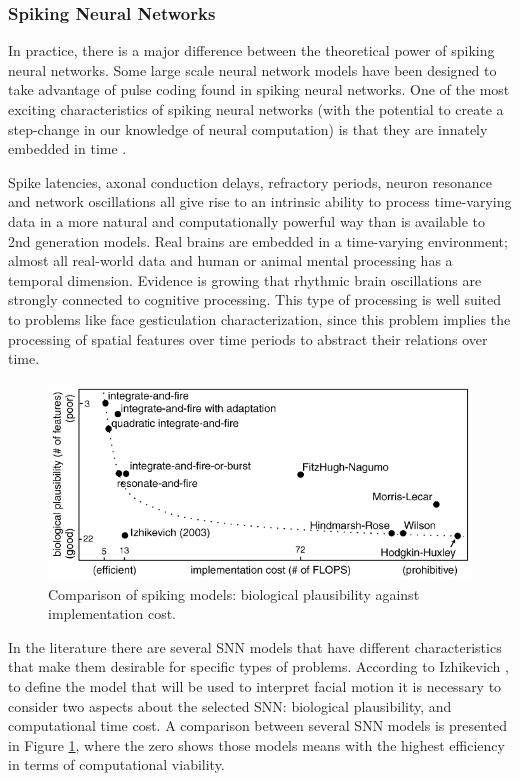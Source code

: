 \subsubsection{Spiking Neural Networks}
In practice, there is a major difference between the theoretical power of spiking neural networks. Some large scale neural network models have been designed to take advantage of pulse coding found in spiking neural networks. One of the most exciting characteristics of spiking neural networks (with the potential to create a step-change in our knowledge of neural computation) is that they are innately embedded in time \cite{Maass1996}.

Spike latencies, axonal conduction delays, refractory periods, neuron resonance and network oscillations all give rise to an intrinsic ability to process time-varying data in a more natural and computationally powerful way than is available to 2nd generation models. Real brains are embedded in a time-varying environment; almost all real-world data and human or animal mental processing has a temporal dimension. Evidence is growing that rhythmic brain oscillations are strongly connected to cognitive processing. This type of processing is well suited to problems like face gesticulation characterization, since this problem implies the processing of spatial features over time periods to abstract their relations over time.

\begin{figure}[h]
    \centering
   \includegraphics[scale=0.7]{images/Figure3Comparison.png}
    \caption{Comparison of spiking models: biological plausibility against implementation cost.}
    \label{fig:Comparison}
\end{figure}

In the literature there are several SNN models that have different characteristics that make them desirable for specific types of problems. According to Izhikevich \cite{Izhikevich2004}, to define the model that will be used to interpret facial motion it is necessary to consider two aspects about the selected SNN: biological plausibility, and computational time cost. A comparison between several SNN models is presented in Figure \ref{fig:Comparison}, where the zero shows those models means with the highest efficiency in terms of computational viability.

